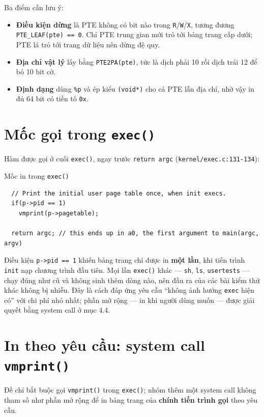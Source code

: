 Ba điểm cần lưu ý:

\begin{itemize}[itemsep=0pt, topsep=2.5pt, leftmargin=1.5cm]
    \item \textbf{Điều kiện dừng} là PTE không có bit nào trong \texttt{R}/\texttt{W}/\texttt{X}, tương đương \texttt{PTE\_LEAF(pte) == 0}. Chỉ PTE trung gian mới trỏ tới bảng trang cấp dưới; PTE lá trỏ tới trang dữ liệu nên dừng đệ quy.
    \item \textbf{Địa chỉ vật lý} lấy bằng \texttt{PTE2PA(pte)}, tức là dịch phải 10 rồi dịch trái 12 để bỏ 10 bit cờ.
    \item \textbf{Định dạng} dùng \texttt{\%p} và ép kiểu \texttt{(void*)} cho cả PTE lẫn địa chỉ, nhờ vậy in đủ 64 bit có tiền tố \texttt{0x}.
\end{itemize}

\section{Mốc gọi trong \texttt{exec()}}

Hàm được gọi ở cuối \texttt{exec()}, ngay trước \texttt{return argc} (\texttt{kernel/exec.c:131-134}):

\begin{codebox}[execVmprint]{Mốc in trong \texttt{exec()}}
    \begin{verbatim}
  // Print the initial user page table once, when init execs.
  if(p->pid == 1)
    vmprint(p->pagetable);

  return argc; // this ends up in a0, the first argument to main(argc, argv)
    \end{verbatim}
\end{codebox}

Điều kiện \texttt{p->pid == 1} khiến bảng trang chỉ được in \textbf{một lần}, khi tiến trình \texttt{init} nạp chương trình đầu tiên. Mọi lần \texttt{exec()} khác --- \texttt{sh}, \texttt{ls}, \texttt{usertests} --- chạy đúng như cũ và không sinh thêm dòng nào, nên đầu ra của các bài kiểm thử khác không bị nhiễu. Đây là cách đáp ứng yêu cầu ``không ảnh hưởng \texttt{exec} hiện có'' với chi phí nhỏ nhất; phần mở rộng --- in khi người dùng muốn --- được giải quyết bằng system call ở mục 4.4.

\section{In theo yêu cầu: system call \texttt{vmprint()}}

Đề chỉ bắt buộc gọi \texttt{vmprint()} trong \texttt{exec()}; nhóm thêm một system call không tham số như phần mở rộng để in bảng trang của \textbf{chính tiến trình gọi} theo yêu cầu.


